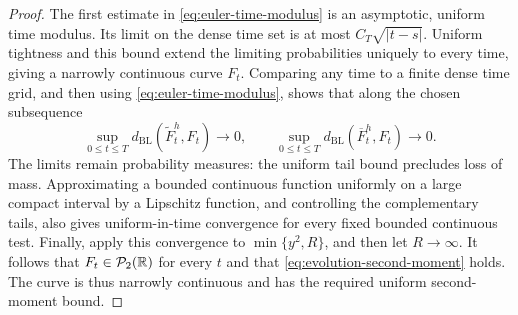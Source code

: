 \begin{proof}
The first estimate in \eqref{eq:euler-time-modulus} is an asymptotic, uniform time modulus.
Its limit on the dense time set is at most \(C_T\sqrt{|t-s|}\).
Uniform tightness and this bound extend the limiting probabilities uniquely to every time, giving a narrowly continuous curve \(F_t\).
Comparing any time to a finite dense time grid, and then using \eqref{eq:euler-time-modulus}, shows that along the chosen subsequence
\begin{equation}
 \sup_{0\le t\le T}
 d_{\mathrm{BL}}(\widetilde F_t^h,F_t)\longrightarrow0,
 \qquad
 \sup_{0\le t\le T}
 d_{\mathrm{BL}}(\overline F_t^h,F_t)\longrightarrow0.
 \label{eq:euler-uniform-narrow-limit}
\end{equation}
The limits remain probability measures: the uniform tail bound precludes loss of mass.
Approximating a bounded continuous function uniformly on a large compact interval by a Lipschitz function, and controlling the complementary tails, also gives uniform-in-time convergence for every fixed bounded continuous test.
Finally, apply this convergence to \(\min\{y^2,R\}\), and then let \(R\to\infty\).
It follows that \(F_t\in\mathcal P_2(\mathbb R)\) for every \(t\) and that \eqref{eq:evolution-second-moment} holds.
The curve is thus narrowly continuous and has the required uniform second-moment bound.


\end{proof}
